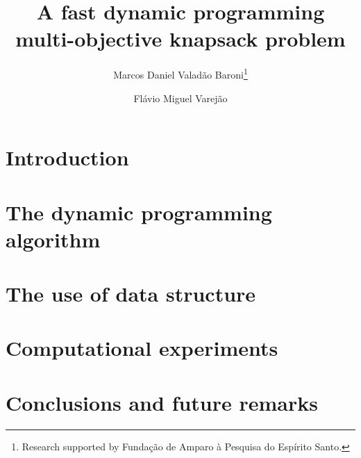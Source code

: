 \documentclass{article}
\begin{document}
\title{A fast dynamic programming multi-objective knapsack problem}

\author{
   Marcos Daniel Valad\~ao Baroni\thanks{Research supported by Funda\c c\~ao de Amparo \`a Pesquisa do Esp\'irito Santo.}
   \and
   Fl\'avio Miguel Varej\~ao
}

\maketitle

\begin{abstract}

\end{abstract}

\section{Introduction}
\label{sec:intro}


\section{The dynamic programming algorithm}
\label{sec:dynprog}


\section{The use of data structure}
\label{sec:kdtree}


\section{Computational experiments}
\label{sec:exp}


\section{Conclusions and future remarks}
\label{sec:conc}


%

\end{document}
